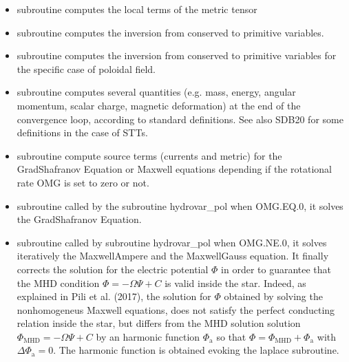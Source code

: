 \documentclass[letterpaper,10pt,english]{sphinxmanual}
\begin{document}
\begin{itemize}
\begin{itemize}
\item {} 
\sphinxAtStartPar
subroutine  \sphinxhyphen{} computes the local terms of the metric tensor

\item {} 
\sphinxAtStartPar
subroutine  \sphinxhyphen{} computes the inversion from conserved to primitive variables.

\item {} 
\sphinxAtStartPar
subroutine  \sphinxhyphen{} computes the inversion from conserved to primitive variables for the specific case of poloidal field.

\item {} 
\sphinxAtStartPar
subroutine  \sphinxhyphen{} computes several quantities (e.g. mass, energy, angular momentum, scalar charge, magnetic deformation) at the end of the convergence loop, according to standard definitions. See also SDB20 for some definitions in the case of STTs.

\item {} 
\sphinxAtStartPar
subroutine  \sphinxhyphen{} compute source terms (currents and metric) for the Grad\sphinxhyphen{}Shafranov
Equation or Maxwell equations depending if the rotational rate OMG is set to zero or not.

\item {} 
\sphinxAtStartPar
subroutine  \sphinxhyphen{} called by the subroutine hydrovar\_pol when OMG.EQ.0, it solves
the Grad\sphinxhyphen{}Shafranov Equation.

\item {} 
\sphinxAtStartPar
subroutine  \sphinxhyphen{} called by subroutine hydrovar\_pol when OMG.NE.0, it solves iteratively the Maxwell\sphinxhyphen{}Ampere and the Maxwell\sphinxhyphen{}Gauss equation. It finally corrects the solution for the electric potential \(\Phi\) in order to guarantee that the MHD condition \(\Phi = -\Omega \Psi + C\) is valid
inside the star. Indeed, as explained in Pili et al. (2017), the solution for \(\Phi\) obtained by solving
the non\sphinxhyphen{}homogeneus Maxwell equations, does not satisfy the perfect conducting relation inside
the star, but differs from the MHD solution solution \(\Phi _\mathrm{MHD} = -\Omega \Psi + C\) by an harmonic function
\(\Phi _\mathrm{a}\) so that \(\Phi = \Phi _\mathrm{MHD} + \Phi _\mathrm{a}\) with \(\Delta \Phi _\mathrm{a} = 0\). The harmonic function is obtained evoking the laplace subroutine.


\end{itemize}
\end{itemize}
\end{document}
